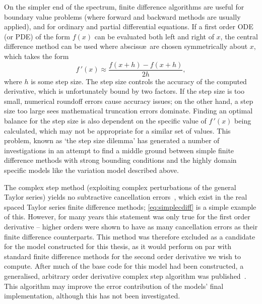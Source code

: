 On the simpler end of the spectrum, finite difference algorithms are useful for boundary value problems (where forward and backward methods are usually applied), and for ordinary and partial differential equations.
If a first order ODE (or PDE) of the form $f(x)$ can be evaluated both left and right of $x$, the central difference method can be used where absciss\ae\ are chosen symmetrically about $x$, which takes the form
\begin{equation}
f\,'(x) \approx \frac{f(x+h)-f(x+h)}{2h},\label{eq:simplecdiff}
\end{equation}
where $h$ is some step size.
The step size controls the accuracy of the computed derivative, which is unfortunately bound by two factors.
If the step size is too small, numerical roundoff errors cause accuracy issues; on the other hand, a step size too large sees mathematical truncation errors dominate.
Finding an optimal balance for the step size is also dependent on the specific value of $f\,'(x)$ being calculated, which may not be appropriate for a similar set of values. 
This problem, known as `the step size dilemma' has generated a number of investigations in an attempt to find a middle ground between simple finite difference methods with strong bounding conditions and the highly domain specific models like the variation model described above.

The complex step method (exploiting complex perturbations of the general Taylor series) yields no subtractive cancellation errors~\cite{Squire1998}, which exist in the real spaced Taylor series finite difference methods; \cref{eq:simplecdiff} is a simple example of this.
However, for many years this statement was only true for the first order derivative -- higher orders were shown to have as many cancellation errors as their finite difference counterparts.
This method was therefore excluded as a candidate for the model constructed for this thesis, as it would perform on par with standard finite difference methods for the second order derivative we wish to compute.
After much of the base code for this model had been constructed, a generalised, arbitrary order derivative complex step algorithm was published~\cite{Lantoine2012}.
This algorithm may improve the error contribution of the models' final implementation, although this has not been investigated.

